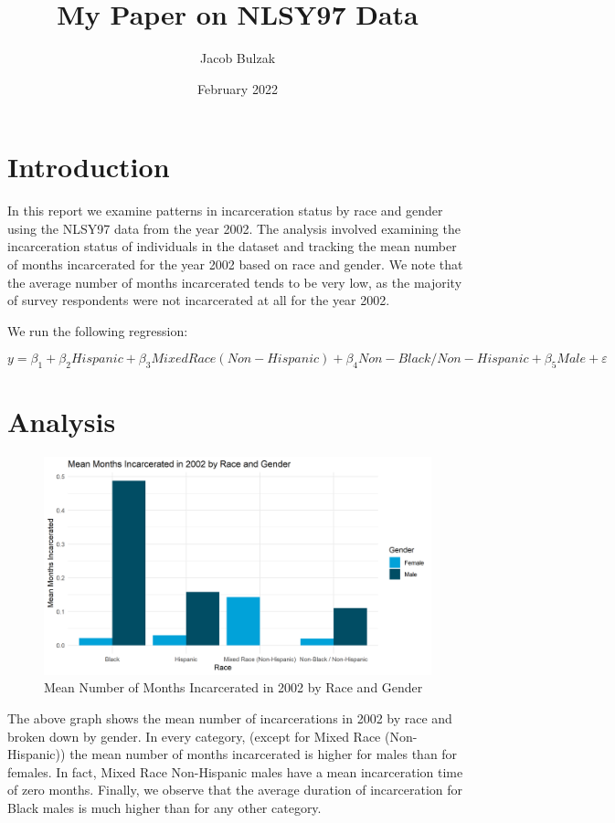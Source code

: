 \documentclass{article}
\author{Jacob Bulzak}
\title{My Paper on NLSY97 Data}
\date{February 2022}
\begin{document}
\maketitle

\section{Introduction}

In this report we examine patterns in incarceration status by race and gender using the NLSY97 data from the year 2002. The analysis involved examining the incarceration status of individuals in the dataset and tracking the mean number of months incarcerated for the year 2002 based on race and gender. We note that the average number of months incarcerated tends to be very low, as the majority of survey respondents were not incarcerated at all for the year 2002.

We run the following regression:

\begin{equation*}
    y = \beta_1 + \beta_2 Hispanic + \beta_3 Mixed Race (Non-Hispanic)+ \beta_4 Non-Black / Non-Hispanic + \beta_5 Male + \varepsilon
\end{equation*}

\section{Analysis}


\begin{figure}[H]
    \begin{center}
        \includegraphics[width=.85\textwidth]{incarcerated_by_racegender}
    \end{center}
    \caption{Mean Number of Months Incarcerated in 2002 by Race and Gender}
    \label{fig:graph}
\end{figure}

The above graph shows the mean number of incarcerations in 2002 by race and broken down by gender. In every category, (except for Mixed Race (Non-Hispanic)) the mean number of months incarcerated is higher for males than for females. In fact, Mixed Race Non-Hispanic males have a mean incarceration time of zero months. Finally, we observe that the average duration of incarceration for Black males is much higher than for any other category.
\end{document}
